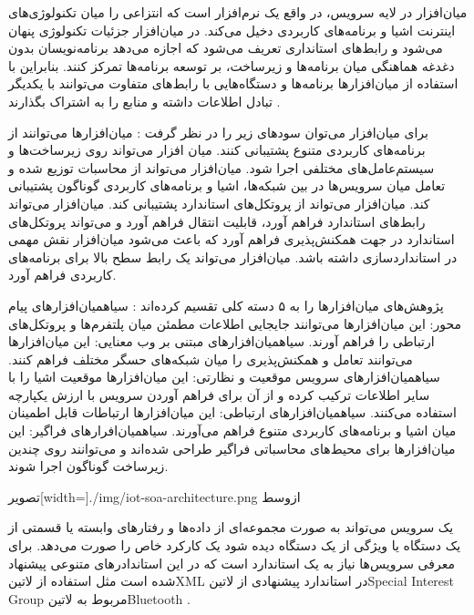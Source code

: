 میان‌افزار در لایه سرویس، در واقع یک نرم‌افزار است که انتزاعی را میان تکنولوژی‌های اینترنت اشیا و برنامه‌های کاربردی دخیل می‌کند.
در میان‌افزار جزئیات تکنولوژی پنهان می‌شود و رابط‌های استانداری تعریف می‌شود که اجازه می‌دهد برنامه‌نویسان بدون دغدغه هماهنگی میان برنامه‌ها و زیرساخت، بر توسعه برنامه‌ها تمرکز کنند.
بنابراین با استفاده از میان‌افزارها برنامه‌ها و دستگاه‌هایی با رابط‌های متفاوت می‌توانند با یکدیگر تبادل اطلاعات داشته و منابع را به اشتراک بگذارند
.

برای میان‌افزار می‌توان سودهای زیر را در نظر گرفت
:
 میان‌افزارها می‌توانند از برنامه‌های کاربردی متنوع پشتیبانی کنند.
 میان افزار می‌تواند روی زیرساخت‌ها و سیستم‌عامل‌های مختلفی اجرا شود.
 میان‌افزار می‌تواند از محاسبات توزیع شده و تعامل میان سرویس‌ها در بین شبکه‌ها، اشیا و برنامه‌های کاربردی گوناگون پشتیبانی کند.
 میان‌افزار می‌تواند از پروتکل‌های استاندارد پشتیبانی کند.
 میان‌افزار می‌تواند رابط‌های استاندارد فراهم آورد، قابلیت انتقال فراهم آورد و می‌تواند پروتکل‌های استاندارد در جهت همکنش‌پذیری فراهم آورد که باعث می‌شود میان‌افزار نقش مهمی در استانداردسازی داشته باشد.
 میان‌افزار می‌تواند یک رابط سطح بالا برای برنامه‌های کاربردی فراهم آورد.

پژوهش‌های میان‌افزارها را به ۵ دسته کلی تقسیم کرده‌اند
:
 ‌سیاه{میان‌افزارهای پیام محور}: این میان‌افزارها می‌توانند جایجایی اطلاعات مطمئن میان پلتفرم‌ها و پروتکل‌های ارتباطی را فراهم آورند.
 ‌سیاه{میان‌افزارهای مبتنی بر وب معنایی}: این میان‌افزارها می‌توانند تعامل و همکنش‌پذیری را میان شبکه‌های حسگر مختلف فراهم کنند.
 ‌سیاه{میان‌افزارهای سرویس موقعیت و نظارتی}: این میان‌افزارها موقعیت اشیا را با سایر اطلاعات ترکیب کرده و از آن برای فراهم آوردن سرویس با ارزش یکپارچه استفاده می‌کنند.
 ‌سیاه{میان‌افزارهای ارتباطی}: این میان‌افزارها ارتباطات قابل اطمینان میان اشیا و برنامه‌های کاربردی متنوع فراهم می‌آورند.
 ‌سیاه{میان‌افرارهای فراگیر}: این میان‌افزارها برای محیط‌های محاسباتی فراگیر طراحی شده‌اند و می‌توانند روی چندین زیرساخت گوناگون اجرا شوند.

‌تصویر[width=\textwidth]{./img/iot-soa-architecture.png}
‌ازوسط

یک سرویس می‌تواند به صورت مجموعه‌ای از داده‌ها و رفتارهای وابسته یا قسمتی از یک دستگاه یا ویژگی از یک دستگاه دیده شود یک کارکرد خاص را صورت می‌دهد.
برای معرفی سرویس‌ها نیاز به یک استاندارد است که در این استاندادرهای متنوعی پیشنهاد شده است مثل استفاده از ‌لاتین{XML} در استاندارد پیشنهادی از ‌لاتین{Special Interest Group} مربوط به ‌لاتین{Bluetooth}
.

